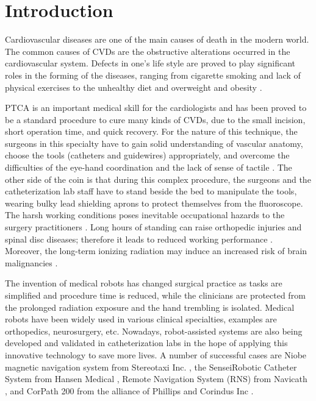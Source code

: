 \section{Introduction}

Cardiovascular diseases are one of the main causes of death in the modern world.
The common causes of CVDs are the obstructive alterations occurred in the cardiovascular system.
Defects in one's life style are proved to play significant roles in the forming of the diseases, ranging from cigarette smoking and lack of physical exercises to the unhealthy diet and overweight and obesity \cite{Go2013}.

PTCA is an important medical skill for the cardiologists and has been proved to be a standard procedure to cure many kinds of CVDs, due to the small incision, short operation time, and quick recovery.
For the nature of this technique, the surgeons in this specialty have to gain solid understanding of vascular anatomy, choose the tools (catheters and guidewires) appropriately, and overcome the difficulties of the eye-hand coordination and the lack of sense of tactile \cite{Li2012CUHK}.
The other side of the coin is that during this complex procedure, the surgeons and the catheterization lab staff have to stand beside the bed to manipulate the tools, wearing bulky lead shielding aprons to protect themselves from the fluoroscope.
The harsh working conditions poses inevitable occupational hazards to the surgery practitioners \cite{Klein2009}.
Long hours of standing can raise orthopedic injuries and spinal disc diseases; therefore it leads to reduced working performance \cite{Goldstein2004}.
Moreover, the long-term ionizing radiation may induce an increased risk of brain malignancies \cite{Roguin2012}.

The invention of medical robots has changed surgical practice as tasks are simplified and procedure time is reduced, while the clinicians are protected from the prolonged radiation exposure and the hand trembling is isolated.
Medical robots have been widely used in various clinical specialties, examples are orthopedics, neurosurgery, etc.
Nowadays, robot-assisted systems are also being developed and validated in catheterization labs in the hope of applying this innovative technology to save more lives.
A number of successful cases are Niobe magnetic navigation system from Stereotaxi Inc. \cite{NIOBEWeb}, the SenseiRobotic Catheter System from Hansen Medical \cite{HansenWeb}, Remote Navigation System (RNS) from Navicath \cite{Beyar2006RNS}, and CorPath 200 from the alliance of Phillips and Corindus Inc \cite{Smilowitz2012}.

